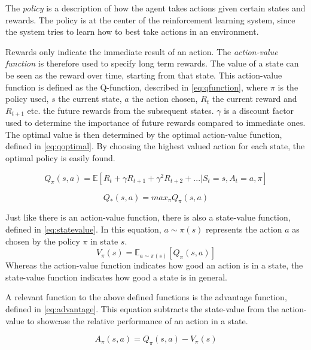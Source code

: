 \documentclass{kththesis}
\begin{document}
The \textit{policy} is a description of how the agent takes actions given certain states and rewards. The policy is at the center of the reinforcement learning system, since the system tries to learn how to best take actions in an environment. \parencite{sutton1998introduction}

Rewards only indicate the immediate result of an action. The \textit{action-value function} is therefore used to specify long term rewards. The value of a state can be seen as the reward over time, starting from that state. This action-value function is defined as the Q-function, described in \autoref{eq:qfunction}, where $\pi$ is the policy used, $s$ the current state, $a$ the action chosen, $R_t$ the current reward and $R_{t+1}$ etc. the future rewards from the subsequent states. $\gamma$ is a discount factor used to determine the importance of future rewards compared to immediate ones. The optimal value is then determined by the optimal action-value function, defined in \autoref{eq:qoptimal}. By choosing the highest valued action for each state, the optimal policy is easily found. \parencite{van2016deep}

\begin{equation}
\label{eq:qfunction}
Q_\pi(s, a) = \mathbb{E}[R_t + \gamma R_{t+1} + \gamma^2R_{t+2} + ... | S_t = s, A_t = a, \pi]
\end{equation}

\begin{equation}
\label{eq:qoptimal}
Q_*(s, a) = max_\pi Q_\pi(s, a)
\end{equation}

Just like there is an action-value function, there is also a state-value function, defined in \autoref{eq:statevalue}. In this equation, $a\sim\pi(s)$ represents the action $a$ as chosen by the policy $\pi$ in state $s$.
\begin{equation}
\label{eq:statevalue}
V_\pi(s) = \mathbb{E}_{a\sim\pi(s)}[Q_\pi(s,a)]
\end{equation}
Whereas the action-value function indicates how good an action is in a state, the state-value function indicates how good a state is in general. \parencite{wang2015dueling}

A relevant function to the above defined functions is the advantage function, defined in \autoref{eq:advantage}. This equation subtracts the state-value from the action-value to showcase the relative performance of an action in a state. \parencite{wang2015dueling}

\begin{equation}
\label{eq:advantage}
A_\pi(s,a) = Q_\pi(s,a) - V_\pi(s)
\end{equation}
\end{document}
